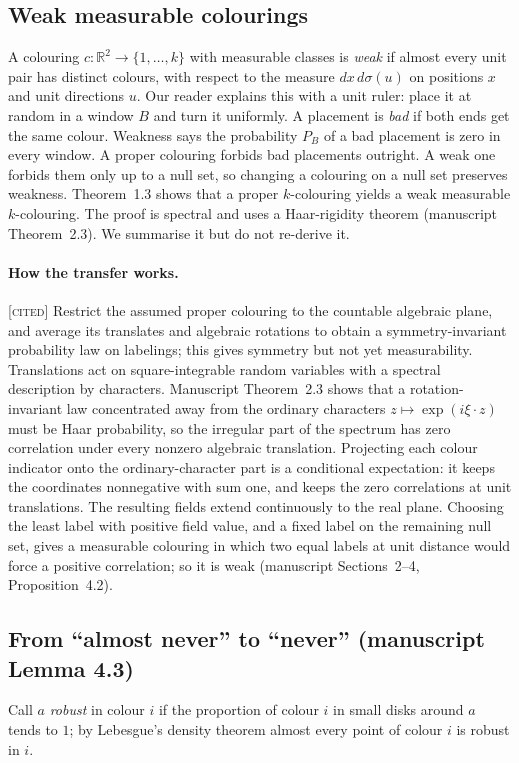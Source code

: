 \documentclass[11pt]{article}
\theoremstyle{definition}
\theoremstyle{remark}
\newcommand{\R}{\mathbb{R}}
\newcommand{\st}[1]{\textsc{[#1]}}
\begin{document}
\subsection{Weak measurable colourings}
A colouring $c:\R^2\to\{1,\dots,k\}$ with measurable classes is \emph{weak} if almost every unit pair has distinct colours, with respect to the measure $dx\,d\sigma(u)$ on positions $x$ and unit directions $u$. Our reader explains this with a unit ruler: place it at random in a window $B$ and turn it uniformly. A placement is \emph{bad} if both ends get the same colour. Weakness says the probability $P_B$ of a bad placement is zero in every window. A proper colouring forbids bad placements outright. A weak one forbids them only up to a null set, so changing a colouring on a null set preserves weakness. Theorem~1.3 shows that a proper $k$-colouring yields a weak measurable $k$-colouring. The proof is spectral and uses a Haar-rigidity theorem (manuscript Theorem~2.3). We summarise it but do not re-derive it.

\paragraph{How the transfer works.} \st{cited} Restrict the assumed proper colouring to the countable algebraic plane, and average its translates and algebraic rotations to obtain a symmetry-invariant probability law on labelings; this gives symmetry but not yet measurability. Translations act on square-integrable random variables with a spectral description by characters. Manuscript Theorem~2.3 shows that a rotation-invariant law concentrated away from the ordinary characters $z\mapsto\exp(i\xi\cdot z)$ must be Haar probability, so the irregular part of the spectrum has zero correlation under every nonzero algebraic translation. Projecting each colour indicator onto the ordinary-character part is a conditional expectation: it keeps the coordinates nonnegative with sum one, and keeps the zero correlations at unit translations. The resulting fields extend continuously to the real plane. Choosing the least label with positive field value, and a fixed label on the remaining null set, gives a measurable colouring in which two equal labels at unit distance would force a positive correlation; so it is weak (manuscript Sections~2--4, Proposition~4.2).

\subsection{From ``almost never'' to ``never'' (manuscript Lemma 4.3)}
Call $a$ \emph{robust} in colour $i$ if the proportion of colour $i$ in small disks around $a$ tends to $1$; by Lebesgue's density theorem almost every point of colour $i$ is robust in $i$.
\end{document}

